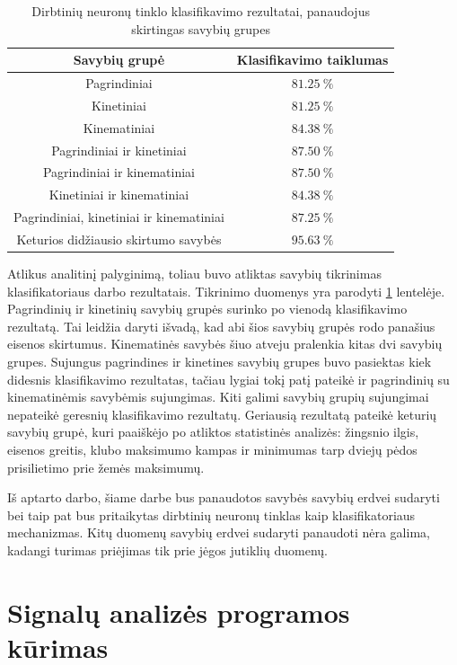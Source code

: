 \documentclass[]{vgtuef}
\begin{document}
\begin{table}
	\centering
	\renewcommand{\arraystretch}{1.3}
	\caption{Dirbtinių neuronų tinklo klasifikavimo rezultatai, panaudojus skirtingas savybių grupes \cite{6151536}}
	\label{table:ann_table_results}
	\begin{tabular}{|c|c|} \hline
		Savybių grupė & Klasifikavimo taiklumas \\ \hline
		Pagrindiniai & $81.25~\%$ \\ \hline
		Kinetiniai & $81.25~\%$ \\ \hline
		Kinematiniai & $84.38~\%$ \\ \hline
		Pagrindiniai ir kinetiniai & $87.50~\%$ \\ \hline
		Pagrindiniai ir kinematiniai & $87.50~\%$ \\ \hline
		Kinetiniai ir kinematiniai & $84.38~\%$ \\ \hline
		Pagrindiniai, kinetiniai ir kinematiniai & $87.25~\%$ \\ \hline	
		Keturios didžiausio skirtumo savybės & $95.63~\%$ \\ \hline	
	\end{tabular}
\end{table}

Atlikus analitinį palyginimą, toliau buvo atliktas savybių tikrinimas klasifikatoriaus darbo rezultatais. Tikrinimo duomenys yra parodyti \ref{table:ann_table_results} lentelėje. Pagrindinių ir kinetinių savybių grupės surinko po vienodą klasifikavimo rezultatą. Tai leidžia daryti išvadą, kad abi šios savybių grupės rodo panašius eisenos skirtumus. Kinematinės savybės šiuo atveju pralenkia kitas dvi savybių grupes. Sujungus pagrindines ir kinetines savybių grupes buvo pasiektas kiek didesnis klasifikavimo rezultatas, tačiau lygiai tokį patį pateikė ir pagrindinių su kinematinėmis savybėmis sujungimas. Kiti galimi savybių grupių sujungimai nepateikė geresnių klasifikavimo rezultatų. Geriausią rezultatą pateikė keturių savybių grupė, kuri paaiškėjo po atliktos statistinės analizės: žingsnio ilgis, eisenos greitis, klubo maksimumo kampas ir minimumas tarp dviejų pėdos prisilietimo prie žemės maksimumų.

Iš aptarto darbo, šiame darbe bus panaudotos savybės savybių erdvei sudaryti bei taip pat bus pritaikytas dirbtinių neuronų tinklas kaip klasifikatoriaus mechanizmas. Kitų duomenų savybių erdvei sudaryti panaudoti nėra galima, kadangi turimas priėjimas tik prie jėgos jutiklių duomenų.

\section{Signalų analizės programos kūrimas}
\end{document}
